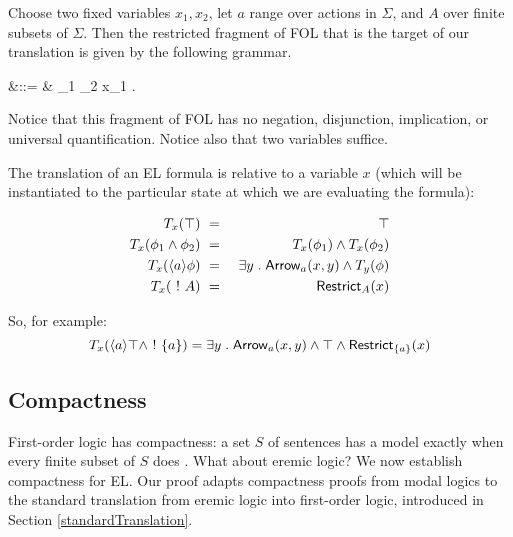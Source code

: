 \NI Choose two fixed variables $x_1, x_2$, let $a$ range over actions
in $\Sigma$, and $A$ over finite subsets of
$\Sigma$. Then the restricted fragment of FOL that is the target
of our translation is given by the following grammar.

\begin{GRAMMAR}
  \phi 
     &\quad ::= \quad&
  \top \fOr {}\fOr {} \fOr \phi_1 \AND \phi_2 \fOr \exists x_1 . \phi 
\end{GRAMMAR}

\NI Notice that this fragment of FOL has no negation, disjunction,
implication, or universal quantification. Notice also that two
variables suffice.

The translation of an EL formula is relative to a variable $x$ (which
will be instantiated to the particular state at which we are
evaluating the formula):

\begin{eqnarray*}
  T_x(\top) & \ = \ & \top  \\
  T_x(\phi_1 \land \phi_2) & \ = \ & T_x(\phi_1) \land T_x(\phi_2)  \\
  T_x(\langle a \rangle \phi) & \ = \ & \exists y \; . \; \mathsf{Arrow}_{a}(x, y) \land T_y(\phi)  \\
  T_x(\ ! \  A) & \ = \ & \mathsf{Restrict}_{A}(x)
\end{eqnarray*}

\NI So, for example:
\[
T_x(\langle a \rangle \top \land \ ! \  \{a\}) = \exists y \; . \; \mathsf{Arrow}_{a}(x, y) \land \top \land \mathsf{Restrict}_{\{a\}}(x)
\]


\subsection{Compactness}

\NI First-order logic has compactness: a set $S$ of sentences has a
model exactly when every finite subset of $S$ does \cite[Chapter
  4.3]{EndertonHB:matinttl}. What about eremic logic?  We now
establish compactness for EL. Our proof adapts compactness proofs from
modal logics \cite{BlackburnP:modlog} to the standard translation from
eremic logic into first-order logic, introduced in Section
\ref{standardTranslation}.


